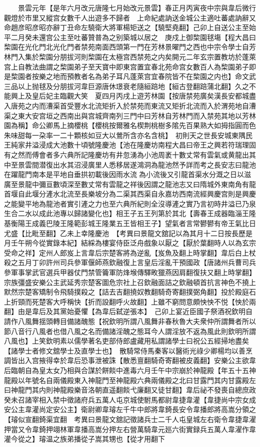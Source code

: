 　　景雲元年【是年六月改元唐隆七月始改元景雲】春正月丙寅夜中宗與韋后微行觀燈於市里又縱宫女數千人出遊多不歸者　上命紀處訥送金城公主適吐蕃處訥辭又命趙彦昭彦昭亦辭丁丑命左驍衛大將軍楊矩送之【驍堅堯翻】己卯上自送公主至始平二月癸未還宫公主至吐蕃贊普為之别築城以居之　庚戍上御棃園毬塲【程大昌曰棃園在光化門北光化門者禁苑南面西頭第一門在芳林景曜門之西也中宗令學士自芳林門入集於棃園分朋拔河則棃園在太極宫西禁苑之内矣開元二年玄宗置教坊於蓬萊宫上自教法曲謂之棃園弟子至天寶中即東宫置宜春北苑命宫女數百人為棃園弟子即是棃園者按樂之地而預教者名為弟子耳凡蓬萊宫宜春院皆不在棃園之内也】命文武三品以上抛毬及分朋拔河韋巨源唐休璟衰老隨絙踣地【絙古登翻踣蒲北翻】久之不能興上及皇后妃主臨觀大笑　夏四月丙戌上遊芳林園【按唐禁苑廣矣漢長安都城盡入唐苑之内而漕渠首受豐水北流矩折入於禁苑而東流又矩折北流而入於渭苑地自漕渠之東大安宫垣之西南出與宫城齊南列三門中曰芳林自芳林門而入禁苑其地以芳林園為稱】命公卿馬上摘櫻桃【櫻桃按爾雅名楔荆桃樹多隂先百果熟大如拇指圓而色朱味甜每一朶率一二十顆核如豆大以鶯所含亦名含桃】　初則天之世長安城東隅民王純家井溢浸成大池數十頃號隆慶池【池在隆慶坊南程大昌曰帝王之興若符瑞理固有之然而傅會者多六典所記隆慶坊有井忽湧為小池周袤十數丈常有雲氣或黄龍出其中至景雲間潜復出水其沼浸廣里人悉移居遂鴻洞為龍池然予詳而考之長安志曰龍池在躍龍門南本是平地自垂拱初載後因雨水流為小流後又引龍首渠水分溉之日以滋廣至景龍中彌亘數頃深至數丈常有雲龍之祥後因謂之龍池志又曰隋城外東南角有龍首堰自此堰分滻水北流至長樂坡分為二渠其西渠自永嘉坊西南流經興慶宫則是興慶之能變平地為龍池者實引滻之力也至六典所紀則全沒導滻之實乃言初時井溢已乃泉生合二水以成此池專以歸諸變化也】相王子五王列第於其北【壽春王成器臨淄王隆基衡陽王成義巴陵王隆範彭城王隆業五王皆相王子】望氣者言常鬰鬰有帝王氣比日尤盛【比毗至翻】乙未上幸隆慶池　【考異曰景龍文舘記以為其月十二日按長歷是月壬午朔今從實錄本紀】結綵為樓宴侍臣泛舟戲象以厭之【厭於葉翻時人以為玄宗受命之祥】定州人郎岌上言韋后宗楚客將為逆亂【岌魚及翻上時掌翻】韋后白上杖殺之五月丁卯許州司兵參軍偃師燕欽融復上言皇后淫亂干預國政【唐諸州兵曹司兵參軍事掌武官選兵甲器仗門禁管籥軍防烽堠傳驛畋獵燕因肩翻復扶又翻上時掌翻】宗族彊盛安樂公主武延秀宗楚客圖危宗社上召欽融面詰之欽融頓首抗言神色不撓上默然宗楚客矯制令飛騎撲殺之【詰去吉翻撓奴教翻騎奇寄翻撲弼角翻】投於殿庭石上折頸而死楚客大呼稱快【折而設翻呼火故翻】上雖不窮問意頗怏怏不悦【怏於兩翻】由是韋后及其黨始憂懼【為韋后弑逆張本】　己卯上宴近臣國子祭酒祝欽明自請作八風舞揺頭轉目備諸醜態【祝欽明所謂八風舞非春秋魯大夫衆仲所謂舞者所以節八音行八風者也借八風之名而備諸淫醜之態耳今人謂淫放不返為風此則欽明所謂八風也】上笑欽明素以儒學著名吏部侍郎盧藏用私謂諸學士曰祝公五經掃地盡矣【諸學士者修文舘學士及直學士也】　散騎常侍馬秦客以醫術光祿少卿楊均以善烹調皆出入宫掖得幸於韋后恐事泄被誅【散悉亶翻騎奇寄翻被皮義翻】安樂公主欲韋后臨朝自為皇太女乃相與合謀於餅餤中進毒六月壬午中宗崩於神龍殿【年五十五神龍殿以年號名自兩儀殿東入神龍門至神龍殿六典兩儀殿之北曰甘露門其内甘露殿左曰神龍門其内則神龍殿樂音洛朝直遥翻餤弋廉翻又徒甘翻】韋后祕不發喪自總庶政癸未召諸宰相入禁中徵諸府兵五萬人屯京城使駙馬都尉韋捷韋灌【韋捷尚中宗女成安公主韋灌尚定安公主】衛尉卿韋璿左千牛中郎將韋錡長安令韋播郎將高嵩分領之【璿似宣翻錡渠宜翻　考異曰景龍文舘記徵諸兵士二千人屯皇城左右衛令韋捷韋濯押當又令韋錡押翊林軍韋播高嵩分押左右營萬騎韋元廵六街實録兵五萬人韋濯作韋灌今從之】璿温之族弟播從子嵩其甥也【從才用翻下